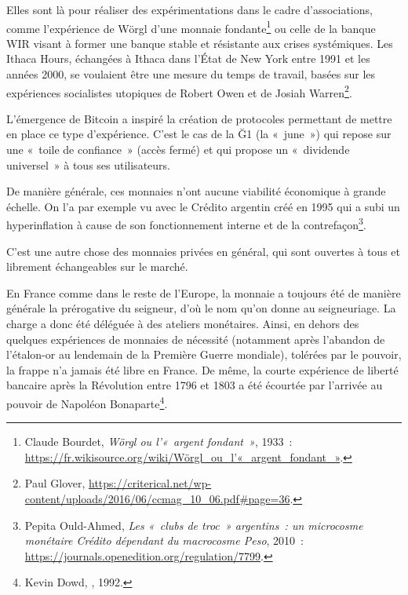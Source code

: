 Elles sont là pour réaliser des expérimentations dans le cadre d'associations, comme l'expérience de Wörgl d'une monnaie fondante\footnote{Claude Bourdet, \emph{Wörgl ou l'«~argent fondant~»}, 1933~: \url{https://fr.wikisource.org/wiki/Wörgl_ou_l’«_argent_fondant_»}.} ou celle de la banque WIR visant à former une banque stable et résistante aux crises systémiques. Les Ithaca Hours, échangées à Ithaca dans l'État de New York entre 1991 et les années 2000, se voulaient être une mesure du temps de travail, basées sur les expériences socialistes utopiques de Robert Owen et de Josiah Warren\footnote{Paul Glover, \url{https://criterical.net/wp-content/uploads/2016/06/ccmag_10_06.pdf\#page=36}.}.

L'émergence de Bitcoin a inspiré la création de protocoles permettant de mettre en place ce type d'expérience. C'est le cas de la Ğ1 (la «~june~») qui repose sur une «~toile de confiance~» (accès fermé) et qui propose un «~dividende universel~» à tous ses utilisateurs. %

De manière générale, ces monnaies n'ont aucune viabilité économique à grande échelle. On l'a par exemple vu avec le Crédito argentin créé en 1995 qui a subi un hyperinflation à cause de son fonctionnement interne et de la contrefaçon\footnote{Pepita Ould-Ahmed, \emph{Les «~clubs de troc~» argentins~: un microcosme monétaire Crédito dépendant du macrocosme Peso}, 2010~: \url{https://journals.openedition.org/regulation/7799}.}.


C'est une autre chose des monnaies privées en général, qui sont ouvertes à tous et librement échangeables sur le marché.

En France comme dans le reste de l'Europe, la monnaie a toujours été de manière générale la prérogative du seigneur, d'où le nom qu'on donne au seigneuriage. La charge a donc été déléguée à des ateliers monétaires. Ainsi, en dehors des quelques expériences de monnaies de nécessité (notamment après l'abandon de l'étalon-or au lendemain de la Première Guerre mondiale), tolérées par le pouvoir, la frappe n'a jamais été libre en France. De même, la courte expérience de liberté bancaire après la Révolution entre 1796 et 1803 a été écourtée par l'arrivée au pouvoir de Napoléon Bonaparte\footnote{Kevin Dowd, , 1992.}.

